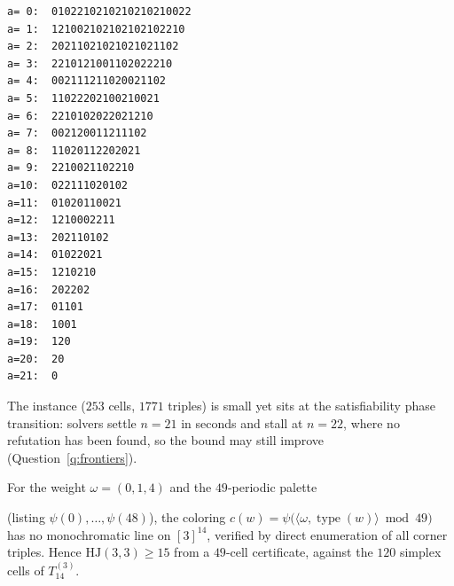\documentclass[12pt]{article}
\newcommand{\HJ}{\mathrm{HJ}}
\DeclareMathOperator{\type}{type}
\begin{document}
\begin{table}[t]
\centering
\caption{The witness for Theorem~\ref{thm:hj33-22}: a $3$-coloring of
$T_{21}^{(3)}$. Row $a$, position $b$ (counting from $b=0$) is the
color $\bar c(a,b,21-a-b)$ assigned to every word of $[3]^{21}$ with
$a$ ones, $b$ twos and $21-a-b$ threes; equivalently, the palette value
$\chi(b+29c)$ at the realized level $b+29c$ of the weight $(0,1,29)$.
The strings are byte-identical to the table embedded in the verifier of
Appendix~\ref{app:verifier} and in \cite{hjcerts}.}
\label{tab:T21}
\begin{lstlisting}[style=plainstyle]
a= 0:  0102210210210210210022
a= 1:  121002102102102102210
a= 2:  20211021021021021102
a= 3:  2210121001102022210
a= 4:  002111211020021102
a= 5:  11022202100210021
a= 6:  2210102022021210
a= 7:  002120011211102
a= 8:  11020112202021
a= 9:  2210021102210
a=10:  022111020102
a=11:  01020110021
a=12:  1210002211
a=13:  202110102
a=14:  01022021
a=15:  1210210
a=16:  202202
a=17:  01101
a=18:  1001
a=19:  120
a=20:  20
a=21:  0
\end{lstlisting}
\end{table}

\begin{remark}\label{rem:hj33}
The instance ($253$ cells, $1771$ triples) is small yet sits at the
satisfiability phase transition: solvers settle $n=21$ in seconds and
stall at $n=22$, where no refutation has been found, so the bound may
still improve (Question~\ref{q:frontiers}).
\end{remark}

\begin{proposition}\label{prop:hj33-15}
For the weight $\omega=(0,1,4)$ and the $49$-periodic palette
\begin{center}
\end{center}
\textup{(}listing $\psi(0),\dots,\psi(48)$\textup{)}, the coloring
$c(w)=\psi\bigl(\langle\omega,\type(w)\rangle\bmod 49\bigr)$ has no
monochromatic line on $[3]^{14}$, verified by direct enumeration of all
corner triples. Hence $\HJ(3,3)\ge 15$ from a $49$-cell certificate,
against the $120$ simplex cells of $T_{14}^{(3)}$.
\end{proposition}
\end{document}
